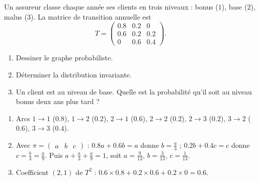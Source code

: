 \begin{exercise}
Un assureur classe chaque année ses clients en trois niveaux : bonus ($1$), base ($2$), malus ($3$). La matrice de transition annuelle est
\[T=\begin{pmatrix}\num{0,8}&\num{0,2}&0\\\num{0,6}&\num{0,2}&\num{0,2}\\0&\num{0,6}&\num{0,4}\end{pmatrix}.\]
\begin{enumerate}
\item Dessiner le graphe probabiliste.
\item Déterminer la distribution invariante.
\item Un client est au niveau de base. Quelle est la probabilité qu'il soit au niveau bonus deux ans plus tard ?
\end{enumerate}
\end{exercise}
\begin{solution}
\begin{enumerate}
\item Arcs $1\to1$ ($\num{0,8}$), $1\to2$ ($\num{0,2}$), $2\to1$ ($\num{0,6}$), $2\to2$ ($\num{0,2}$), $2\to3$ ($\num{0,2}$), $3\to2$ ($\num{0,6}$), $3\to3$ ($\num{0,4}$).
\item Avec $\pi=\begin{pmatrix}a&b&c\end{pmatrix}$ : $\num{0,8}a+\num{0,6}b=a$ donne $b=\frac a3$ ; $\num{0,2}b+\num{0,4}c=c$ donne $c=\frac b3=\frac a9$. Puis $a+\frac a3+\frac a9=1$, soit $a=\frac9{13}$, $b=\frac3{13}$, $c=\frac1{13}$.
\item Coefficient $(2,1)$ de $T^2$ : $\num{0,6}\times\num{0,8}+\num{0,2}\times\num{0,6}+\num{0,2}\times0=\num{0,6}$.
\end{enumerate}
\end{solution}

